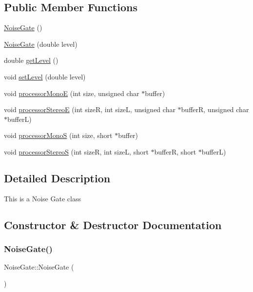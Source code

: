 \subsection*{Public Member Functions}
\begin{DoxyCompactItemize}
\item 
\hyperlink{classNoiseGate_ae9ccbe5934108f756ada0e492db5f71e}{Noise\+Gate} ()
\item 
\hyperlink{classNoiseGate_a595f0fbe191ba5eaed8b52c8f2c5049f}{Noise\+Gate} (double level)
\item 
double \hyperlink{classNoiseGate_a48958705ac7b9de4cfe5ae284b8fb4f6}{get\+Level} ()
\item 
void \hyperlink{classNoiseGate_aa03603d23e350f5d9d1e0914de862f57}{set\+Level} (double level)
\item 
void \hyperlink{classNoiseGate_ab2965cbd79e9bb7cd5d972967d3da678}{processor\+MonoE} (int size, unsigned char $\ast$buffer)
\item 
void \hyperlink{classNoiseGate_a3b6bbb8efccac794fe3abf6dbbd92c1f}{processor\+StereoE} (int sizeR, int sizeL, unsigned char $\ast$bufferR, unsigned char $\ast$bufferL)
\item 
void \hyperlink{classNoiseGate_a46b2ad11fa1dac657450c2299026bee4}{processor\+MonoS} (int size, short $\ast$buffer)
\item 
void \hyperlink{classNoiseGate_aa45ac001ec6d3dd7ad935cf92266a285}{processor\+StereoS} (int sizeR, int sizeL, short $\ast$bufferR, short $\ast$bufferL)
\end{DoxyCompactItemize}


\subsection{Detailed Description}
This is a Noise Gate class 

\subsection{Constructor \& Destructor Documentation}
\mbox{\label{classNoiseGate_ae9ccbe5934108f756ada0e492db5f71e}} 
\subsubsection{\texorpdfstring{Noise\+Gate()}{NoiseGate()}\hspace{0.1cm}{\footnotesize\ttfamily [1/2]}}
{\footnotesize\ttfamily Noise\+Gate\+::\+Noise\+Gate (\begin{DoxyParamCaption}{ }\end{DoxyParamCaption})}

